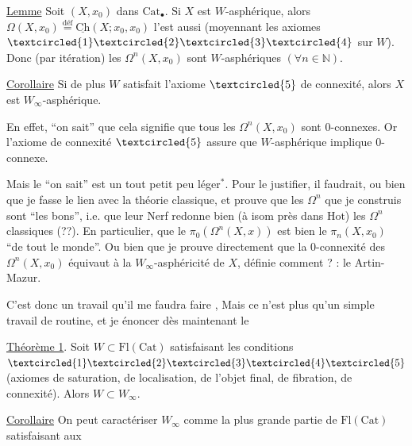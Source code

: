 
\uline{Lemme} Soit $(X,x_0)$ dans $\mathrm{Cat}_{\bullet}$. Si $X$ est $W$-asphérique, alors $\Omega(X,x_0)\overset{\text{déf}}{=}\underline{\mathrm{Ch}}(X;x_0,x_0)$  l'est aussi (moyennant les axiomes $\textcircled{1}\textcircled{2}\textcircled{3}\textcircled{4}$ sur $W$). Donc (par itération) les $\Omega^n(X,x_0)$ sont $W$-asphériques $(\forall n\in\mathbb N)$.


\uline{Corollaire} Si de plus $W$ satisfait l'axiome $\textcircled{5}$ de connexité, alors $X$ est  $W_\infty$-asphérique.

En effet, ``on sait'' que cela signifie que tous les $\Omega^n(X,x_0)$ sont $0$-connexes. Or l'axiome de connexité $\textcircled{5}$ assure que $W$-asphérique implique $0$-connexe.


Mais le ``on sait'' est un tout petit peu léger$^*$. Pour le justifier, il faudrait, ou bien que je fasse le lien avec la théorie  classique, et prouve que les $\Omega^n$ que je construis sont ``les bons'', i.e. que leur Nerf redonne bien (à isom près dans $\mathrm{Hot}$) les $\Omega^n$ classiques (??). En particulier, que le $\pi_0(\Omega^n(X,x))$ est bien le $\pi_n(X,x_0)$ ``de tout le monde''. Ou bien que je prouve directement que la $0$-connexité des \unsure{\S} $\Omega^n(X,x_0)$ équivaut à la $W_\infty$-asphéricité de $X$, définie comment ?  : le Artin-Mazur.

C'est donc un travail qu'il me faudra faire , Mais ce n'est plus qu'un simple travail de routine, et je  énoncer dès maintenant le



\uline{Théorème 1}. Soit $W\subset\mathrm{Fl}(\mathrm{Cat})$ satisfaisant les conditions $\textcircled{1}\textcircled{2}\textcircled{3}\textcircled{4}\textcircled{5}$ (axiomes de saturation, de localisation, de l'objet final, de fibration, de connexité). Alors $W\subset W_\infty$.


\uline{Corollaire} On peut caractériser $W_\infty$ comme la plus grande partie de $\mathrm{Fl}(\mathrm{Cat})$ satisfaisant aux


